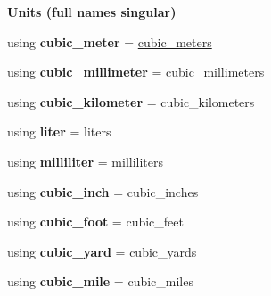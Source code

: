 \begin{Indent}{\bf Units (full names singular)}\par
\begin{DoxyCompactItemize}
\item 
\hypertarget{namespaceunits_1_1volume_a87f2c2f4f3f148a06ea5e252e32a0d7a}{}using {\bfseries cubic\+\_\+meter} = \hyperlink{structunits_1_1unit}{cubic\+\_\+meters}\label{namespaceunits_1_1volume_a87f2c2f4f3f148a06ea5e252e32a0d7a}

\item 
\hypertarget{namespaceunits_1_1volume_aab5d06009abfaa0748e0a178e20c67e1}{}using {\bfseries cubic\+\_\+millimeter} = cubic\+\_\+millimeters\label{namespaceunits_1_1volume_aab5d06009abfaa0748e0a178e20c67e1}

\item 
\hypertarget{namespaceunits_1_1volume_a627ce3af1ae68afe19599cd2a3cbe07c}{}using {\bfseries cubic\+\_\+kilometer} = cubic\+\_\+kilometers\label{namespaceunits_1_1volume_a627ce3af1ae68afe19599cd2a3cbe07c}

\item 
\hypertarget{namespaceunits_1_1volume_a4a83c95eb1f81e2d11e9d0dc764e9e3b}{}using {\bfseries liter} = liters\label{namespaceunits_1_1volume_a4a83c95eb1f81e2d11e9d0dc764e9e3b}

\item 
\hypertarget{namespaceunits_1_1volume_a0d3adb34c242523b69086c47ab897afa}{}using {\bfseries milliliter} = milliliters\label{namespaceunits_1_1volume_a0d3adb34c242523b69086c47ab897afa}

\item 
\hypertarget{namespaceunits_1_1volume_ac5cdd514dd339656efb9397c72fdd6c8}{}using {\bfseries cubic\+\_\+inch} = cubic\+\_\+inches\label{namespaceunits_1_1volume_ac5cdd514dd339656efb9397c72fdd6c8}

\item 
\hypertarget{namespaceunits_1_1volume_a21945db73587c577c44bc7d945c165f3}{}using {\bfseries cubic\+\_\+foot} = cubic\+\_\+feet\label{namespaceunits_1_1volume_a21945db73587c577c44bc7d945c165f3}

\item 
\hypertarget{namespaceunits_1_1volume_af6295d2a72bf0bdecbddfa0f6bf93a1c}{}using {\bfseries cubic\+\_\+yard} = cubic\+\_\+yards\label{namespaceunits_1_1volume_af6295d2a72bf0bdecbddfa0f6bf93a1c}

\item 
\hypertarget{namespaceunits_1_1volume_a8f0f339f5e084269ff4c8f1874080ba5}{}using {\bfseries cubic\+\_\+mile} = cubic\+\_\+miles\label{namespaceunits_1_1volume_a8f0f339f5e084269ff4c8f1874080ba5}


\end{DoxyCompactItemize}
\end{Indent}
